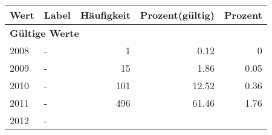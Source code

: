      \begin{longtable}{lXrrr}
     \toprule
     \textbf{Wert} & \textbf{Label} & \textbf{Häufigkeit} & \textbf{Prozent(gültig)} & \textbf{Prozent} \\
     \endhead
     \midrule
     \multicolumn{5}{l}{\textbf{Gültige Werte}}\\

     2008 &
     \multicolumn{1}{X}{ -  } &


       \num{1} &
       \num[round-mode=places,round-precision=2]{0.12} &
         \num[round-mode=places,round-precision=2]{0} \\

     2009 &
     \multicolumn{1}{X}{ -  } &


       \num{15} &
       \num[round-mode=places,round-precision=2]{1.86} &
         \num[round-mode=places,round-precision=2]{0.05} \\

     2010 &
     \multicolumn{1}{X}{ -  } &


       \num{101} &
       \num[round-mode=places,round-precision=2]{12.52} &
         \num[round-mode=places,round-precision=2]{0.36} \\

     2011 &
     \multicolumn{1}{X}{ -  } &


       \num{496} &
       \num[round-mode=places,round-precision=2]{61.46} &
         \num[round-mode=places,round-precision=2]{1.76} \\

     2012 &
     \multicolumn{1}{X}{ -  } &



\end{longtable}

